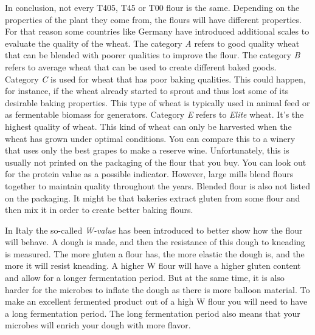 In conclusion, not every T405, T45 or T00 flour is the same. Depending on the properties
of the plant they come from, the flours will have different properties. For that reason
some countries like Germany have introduced additional scales to evaluate the quality of the
wheat. The category \emph{A} refers to good quality wheat that can be blended
with poorer qualities to improve the flour. The category \emph{B} refers to
average wheat that can be used to create different baked goods. Category \emph{C}
is used for wheat that has poor baking qualities. This could happen, for instance,
if the wheat already started to sprout and thus lost some of its desirable
baking properties. This type of wheat is typically used in animal feed or
as fermentable biomass for generators. Category \emph{E} refers to \emph{Elite} wheat. It's
the highest quality of wheat. This kind of wheat can only be harvested when the
wheat has grown under optimal conditions. You can compare this to a winery
that uses only the best grapes to make a reserve wine. Unfortunately, this is
usually not printed
on the packaging of the flour that you buy. You can look out for the protein
value as a possible indicator. However, large mills blend flours together to
maintain quality throughout the years. Blended flour is also not listed on
the packaging. It might be that bakeries extract gluten from some flour and
then mix it in order to create better baking flours.

In Italy the so-called
\emph{W-value} has been introduced to better show how the flour will behave.
A dough is made, and then the resistance of this dough to kneading is measured.
The more gluten a flour has, the more elastic the dough is, and the more it will
resist kneading. A higher W flour will have a higher gluten content and allow for a longer
fermentation period. But at the same time, it is also harder for the microbes to
inflate the dough as there is more balloon material. To make an excellent fermented
product out of a high W flour you will need to have a long fermentation period.
The long fermentation period also means that your microbes will enrich
your dough with more flavor.

\begin{table}[!htb]
    \centering
        
        \caption[Fermentation time versus W-value]{An overview of different
            levels of W-values and the respective hydration and fermentation
            times.}%
        \label{tab:w-value}
\end{table}

